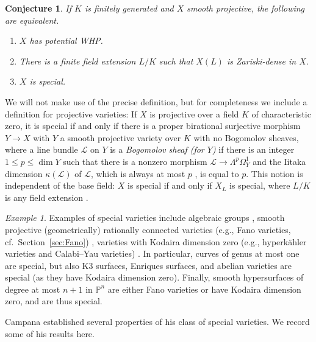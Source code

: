 \documentclass[10pt,a4paper]{amsart}
\theoremstyle{plain}
\newtheorem{conjecture}[theorem]{Conjecture}
\theoremstyle{remark}
\newtheorem{example}[theorem]{Example}
\numberwithin{theorem}{section}
\begin{document}
\begin{conjecture}\label{conj:campana_corvaja_zannier}
If $K$ is finitely generated and $X$ smooth projective, 
the following are equivalent.
\begin{enumerate}
    \item $X$ has potential WHP.
    \item There is a finite field extension $L/K$ such that $X(L)$ is Zariski-dense in $X$.
    \item $X$ is special.
\end{enumerate}
\end{conjecture}

We will not make use of the precise definition, but for completeness we include a definition for projective varieties: If $X$ is projective over a field $K$ of characteristic zero, it is  
special if and only if there is a proper birational surjective morphism $Y \to X$ with $Y$ a smooth projective variety over $K$ with no Bogomolov sheaves,
where a line bundle $\mathcal{L}$ on $Y$ is a \emph{Bogomolov sheaf (for $Y$)} if there is an integer $1 \leq p \leq \dim Y$ such that there is a nonzero morphism $\mathcal{L} \to \Lambda^p \Omega^1_Y$ and the Iitaka dimension $\kappa(\mathcal{L})$ of $\mathcal{L}$,
 which is always at most $p$ \cite[\S 12, Theorem 4]{BogomolovHol},
 is equal to $p$.
This notion is
independent of the base field:  $X$ is special if and only if $X_L$ is special, where $L/K$ is any field extension \cite{BartschJavanpeykar}. 

\begin{example}\label{ex:special}
Examples of special varieties 
include algebraic groups \cite[Lemma~2.11]{Bartsch}, smooth projective (geometrically) rationally connected varieties (e.g., Fano varieties, cf.~Section~\ref{sec:Fano}) \cite[Corollary~2.28]{Ca04},  varieties with Kodaira dimension zero (e.g., hyperk\"ahler varieties and Calabi--Yau varieties) \cite[Theorem~5.1]{Ca04}. In particular, curves of genus at most one are special, but also  K3 surfaces, Enriques surfaces, and abelian varieties are special (as they have Kodaira dimension zero). Finally,  smooth hypersurfaces of degree at most $n+1$ in $\mathbb{P}^n$ are either Fano varieties or have Kodaira dimension zero, and are thus special. 
\end{example}

Campana established several properties of his class of special varieties.    
We record some of  his results here.
\end{document}
